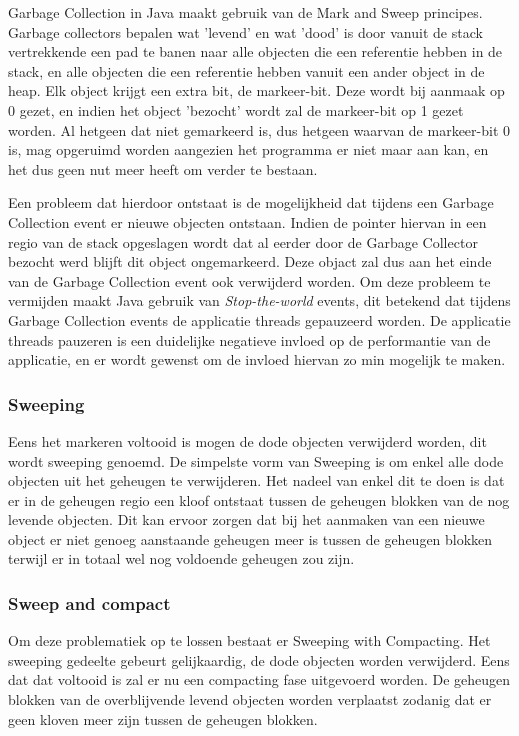 Garbage Collection in Java maakt gebruik van de Mark and Sweep principes.
Garbage collectors bepalen wat 'levend' en wat 'dood' is door vanuit de stack vertrekkende een pad te banen naar alle objecten die een referentie hebben in de stack, en alle objecten die een referentie hebben vanuit een ander object in de heap.
Elk object krijgt een extra bit, de markeer-bit. Deze wordt bij aanmaak op 0 gezet, en indien het object 'bezocht' wordt zal de markeer-bit op 1 gezet worden.
Al hetgeen dat niet gemarkeerd is, dus hetgeen waarvan de markeer-bit 0 is, mag opgeruimd worden aangezien het programma er niet maar aan kan, en het dus geen nut meer heeft om verder te bestaan.


Een probleem dat hierdoor ontstaat is de mogelijkheid dat tijdens een Garbage Collection event er nieuwe objecten ontstaan.
Indien de pointer hiervan in een regio van de stack opgeslagen wordt dat al eerder door de Garbage Collector bezocht werd blijft dit object ongemarkeerd.
Deze objact zal dus aan het einde van de Garbage Collection event ook verwijderd worden.
Om deze probleem te vermijden maakt Java gebruik van \textit{Stop-the-world} events, dit betekend dat tijdens Garbage Collection events de applicatie threads gepauzeerd worden.
De applicatie threads pauzeren is een duidelijke negatieve invloed op de performantie van de applicatie, en er wordt gewenst om de invloed hiervan zo min mogelijk te maken.
\autocite{Putten2022}



\subsubsection{Sweeping}
Eens het markeren voltooid is mogen de dode objecten verwijderd worden, dit wordt sweeping genoemd.
De simpelste vorm van Sweeping is om enkel alle dode objecten uit het geheugen te verwijderen.
Het nadeel van enkel dit te doen is dat er in de geheugen regio een kloof ontstaat tussen de geheugen blokken van de nog levende objecten.
Dit kan ervoor zorgen dat bij het aanmaken van een nieuwe object er niet genoeg aanstaande geheugen meer is tussen de geheugen blokken terwijl er in totaal wel nog voldoende geheugen zou zijn.
\subsubsection{Sweep and compact}
Om deze problematiek op te lossen bestaat er Sweeping with Compacting.
Het sweeping gedeelte gebeurt gelijkaardig, de dode objecten worden verwijderd.
Eens dat dat voltooid is zal er nu een compacting fase uitgevoerd worden.
De geheugen blokken van de overblijvende levend objecten worden verplaatst zodanig dat er geen kloven meer zijn tussen de geheugen blokken.
